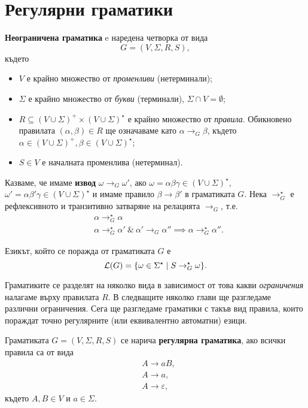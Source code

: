 \section{Регулярни граматики}
\label{sect:regular-grammar}
{\bf Неограничена граматика} e наредена четворка от вида
\[G = (V, \Sigma, R, S),\]
където
\begin{itemize}
\item
  $V$ е крайно множество от {\em променливи} (нетерминали);
\item
  $\Sigma$ е крайно множество от {\em букви} (терминали), $\Sigma \cap V = \emptyset$;
\item
  $R \subseteq (V\cup\Sigma)^+ \times (V \cup \Sigma)^\star$ е крайно множество от {\em правила}.
  Обикновено правилата $(\alpha, \beta) \in R$ ще означаваме като 
  $\alpha \to_G \beta$, където $\alpha \in (V \cup \Sigma)^+, \beta \in (V \cup \Sigma)^\star$;
\item
  $S \in V$ е началната променлива (нетерминал). 
\end{itemize}

Казваме, че имаме {\bf извод} $\omega \to_G \omega'$, ако $\omega = \alpha\beta\gamma \in (V\cup\Sigma)^\star$,
$\omega' = \alpha\beta'\gamma \in (V\cup\Sigma)^\star$ и имаме правило $\beta \to \beta'$ в граматиката $G$.
Нека $\to^\star_G$ е рефлексивното и транзитивно затваряне на релацията $\to_G$, т.е.
\begin{align*}
  & \alpha \to^\star_G \alpha\\
  & \alpha \to^\star_G \alpha'\ \&\ \alpha' \to_G \alpha'' \implies \alpha \to^\star_G \alpha''.
\end{align*}

Езикът, който се поражда от граматиката $G$ е
\[\mathcal{L}(G) = \{\omega \in \Sigma^\star \mid S \to^\star_G \omega\}.\]

Граматиките се разделят на няколко вида в зависимост от това какви {\em ограничения} налагаме върху правилата $R$.
В следващите няколко глави ще разгледаме различни ограничения. Сега ще разгледаме граматики с такъв вид правила,
които пораждат точно регулярните (или еквивалентно автоматни) езици.

Граматиката $G = (V, \Sigma, R, S)$ се нарича {\bf регулярна граматика},
ако всички правила са от вида 
\begin{align*}
  & A \to aB,\\
  & A \to a,\\
  & A \to \varepsilon,
\end{align*}
където $A, B \in V$ и $a \in \Sigma$.  

